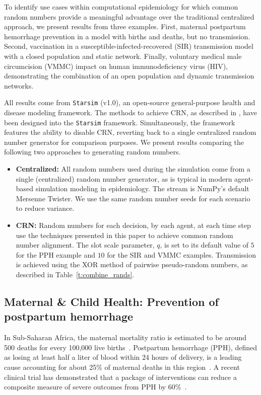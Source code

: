 \documentclass[10pt,letterpaper]{article}
\newcommand{\starsim}{\texttt{Starsim} }
\begin{document}
To identify use cases within computational epidemiology for which common random numbers provide a meaningful advantage over the traditional centralized approach, we present results from three examples. First, maternal postpartum hemorrhage prevention in a model with births and deaths, but no transmission. Second, vaccination in a susceptible-infected-recovered (SIR) transmission model with a closed population and static network. Finally, voluntary medical male circumcision (VMMC) impact on human immunodeficiency virus (HIV), demonstrating the combination of an open population and dynamic transmission networks.

All results come from \starsim \cite{starsim} (v1.0), an open-source general-purpose health and disease modeling framework.  The methods to achieve CRN, as described in , have been designed into the \starsim framework. Simultaneously, the framework features the ability to disable CRN, reverting back to a single centralized random number generator for comparison purposes. We present results comparing the following two approaches to generating random numbers.
\begin{itemize}
    \item \textbf{Centralized:} All random numbers used during the simulation come from a single (centralized) random number generator, as is typical in modern agent-based simulation modeling in epidemiology. The stream is NumPy's default Mersenne Twister. We use the same random number seeds for each scenario to reduce variance.
    \item \textbf{CRN:} Random numbers for each decision, by each agent, at each time step use the techniques presented in this paper to achieve common random number alignment. The slot scale parameter, $q$, is set to its default value of $5$ for the PPH example and $10$ for the SIR and VMMC examples. Transmission is achieved using the XOR method of pairwise pseudo-random numbers, as described in Table~\ref{t:combine_rands}.
\end{itemize}

\subsection*{Maternal \& Child Health: Prevention of postpartum hemorrhage}

In Sub-Saharan Africa, the maternal mortality ratio is estimated to be around 500 deaths for every 100,000 live births~\cite{world2023trends}. Postpartum hemorrhage (PPH), defined as losing at least half a liter of blood within 24 hours of delivery, is a leading cause accounting for about 25\% of maternal deaths in this region~\cite{say_global_2014}. A recent clinical trial has demonstrated that a package of interventions can reduce a composite measure of severe outcomes from PPH by 60\%~\cite{gallos_ioannis_randomized_2023}.
\end{document}
